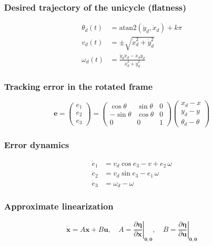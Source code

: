 \subsubsection{Desired trajectory of the unicycle (flatness)}
\begin{align*}
    \theta_d(t)&=\text{atan2}(\dot y_d,\dot x_d)+k\pi\\
    v_d(t)&=\pm\sqrt{\dot x_d^2+\dot y_d^2}\\
    \omega_d(t)&=\frac{\ddot y_d\dot x_d-\ddot x_d\dot y_d}{\dot x_d^2+\dot y_d^2}
\end{align*}

\subsubsection{Tracking error in the rotated frame}
\begin{equation*}
    \mathbf e=\begin{pmatrix}e_1\\e_2\\e_3\end{pmatrix}=\begin{pmatrix}\cos\theta&\sin\theta&0\\-\sin\theta&\cos\theta&0\\0&0&1\end{pmatrix}\begin{pmatrix}x_d-x\\y_d-y\\\theta_d-\theta\end{pmatrix}
\end{equation*}

\subsubsection{Error dynamics}
\begin{align*}
    \dot e_1&=v_d\cos e_3-v+e_2\,\omega\\
    \dot e_2&=v_d\sin e_3-e_1\,\omega\\
    \dot e_3&=\omega_d-\omega
\end{align*}

\subsubsection{Approximate linearization}
\begin{equation*}
    \dot{\mathbf x}=A\mathbf x+B\mathbf u,\quad A=\left.\frac{\partial\boldsymbol\eta}{\partial\mathbf x}\right|_{\mathbf 0,\mathbf 0},\quad B=\left.\frac{\partial\boldsymbol\eta}{\partial\mathbf u}\right|_{\mathbf 0,\mathbf 0}
\end{equation*}


